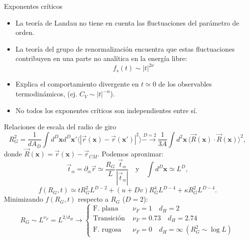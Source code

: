 \documentclass[xcolor=dvipsnames]{beamer}
\begin{document}
\begin{frame}{Exponentes críticos}
\begin{itemize}
  \item La teoría de Landau no tiene en cuenta las fluctuaciones del parámetro de
orden.
  \item  La teoría del grupo de renormalización encuentra que
    estas fluctuaciones contribuyen en una parte no analítica en la energía
    libre:
    \begin{equation*}
      f_s(t)\sim|t|^{2\nu}
    \end{equation*}
  \item Explica el comportamiento divergente en $t\simeq 0$ de los observables
    termodinámicos, (ej. $C_V\sim|t|^{-\alpha}$).
  \item No todos los exponentes críticos son independientes entre sí.
\end{itemize}
\end{frame}
\begin{frame}{Relaciones de escala del radio de giro}
  \begin{equation*}
    R_G^2=\frac{1}{dA_D}\int d^D\mathbf{x}d^D\mathbf{x}' \langle |
    \vec{r}(\mathbf{x})-\vec{r}(\mathbf{x}')|^2\rangle\stackrel{D=2}{-\!\!\!\longrightarrow}\frac{1}{3A}\int d^2\mathbf{x}\, \langle
\vec{R}(\mathbf{x})\cdot\vec{R}(\mathbf{x})\rangle^2,
  \end{equation*}
donde $\vec{R}(\mathbf{x})=\vec{r}(\mathbf{x})-\vec{r}_{CM}$. Podemos aproximar:
  \begin{equation*}
    \vec{t}_{\alpha}=\partial_{\alpha} \vec{r}\simeq \frac{R_G}{L}
    \frac{\vec{t}_{\alpha}}{|\vec{t}_{\alpha}|}\quad \text{y}\quad \int
    d^D\mathbf{x}\simeq L^D,
\end{equation*}
\begin{equation*}
  f(R_G,t)\simeq t R_G^2 L^{D-2}+(u+Dv) R_G^4 L^{D-4}+\kappa R_G^2 L^{D-4}.
\end{equation*}
Minimizando $f(R_G,t)$ respecto a $R_G$ ($D=2$):
\begin{equation*}
  R_G\sim L^{\nu_F}= L^{2/d_H}\rightarrow\begin{cases}
    \text{F. plana }& \nu_F=1\quad d_H=2\\
    \text{Transición }& \nu_F=0.73\quad d_H=2.74\\
    \text{F. rugosa }& \nu_F=0\quad d_H=\infty\ (R_G^2\sim\log L)
  \end{cases}
\end{equation*}
\end{frame}
\end{document}
